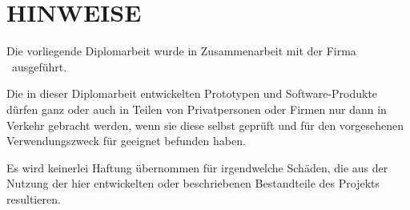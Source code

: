 \chapter{HINWEISE}
\thispagestyle{nurSeitenzahl}

Die vorliegende Diplomarbeit wurde in Zusammenarbeit mit der Firma \firma \ ausgeführt.

Die in dieser Diplomarbeit entwickelten Prototypen und Software-Produkte dürfen ganz oder auch in Teilen von Privatpersonen oder Firmen nur dann in Verkehr gebracht werden, wenn sie diese selbst geprüft und für den vorgesehenen Verwendungszweck für geeignet befunden haben.

Es wird keinerlei Haftung übernommen für irgendwelche Schäden, die aus der Nutzung der hier entwickelten oder beschriebenen Bestandteile des Projekts resultieren.
